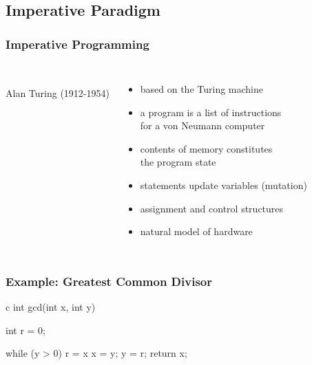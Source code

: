 \documentclass[dvipsnames]{beamer}
\theoremstyle{plain}
\begin{document}
\subsection{Imperative Paradigm}

\begin{frame}
  \frametitle{Imperative Programming}

  \begin{columns}
    \begin{center}
      \\
      Alan Turing (1912-1954)
    \end{center}

    \begin{itemize}
      \item based on the Turing machine
      \item a program is a list of instructions\\
        for a von Neumann computer
      \item contents of memory constitutes\\
        the program \alert{state}

      \pause
      \medskip
      \item statements update variables
        (\alert{mutation})
      \item assignment and control structures

      \pause
      \medskip
      \item natural model of hardware
    \end{itemize}
  \end{columns}
\end{frame}

\begin{frame}[fragile]
  \frametitle{Example: Greatest Common Divisor}

  \begin{example}
    \begin{pygments}[]{c}
int gcd(int x, int y)
{
    int r = 0;

    while (y > 0)
    {
        r = x %
        x = y;
        y = r;
    }
    return x;
}
    \end{pygments}
  \end{example}
\end{frame}
\end{document}
